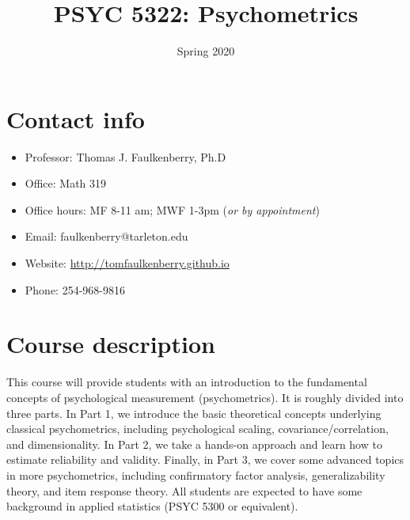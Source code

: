 \documentclass[10pt]{article}
\date{Spring 2020}
\title{PSYC 5322: Psychometrics}
\begin{document}
\maketitle

\section*{Contact info}
\label{sec:orgef0183f}
\begin{itemize}
\item Professor: Thomas J. Faulkenberry, Ph.D
\item Office: Math 319
\item Office hours: MF 8-11 am; MWF 1-3pm (\emph{or by appointment})
\item Email: faulkenberry@tarleton.edu
\item Website: \url{http://tomfaulkenberry.github.io}
\item Phone: 254-968-9816
\end{itemize}

\section*{Course description}
\label{sec:org1a687d4}

This course will provide students with an introduction to the fundamental concepts of psychological measurement (psychometrics). It is roughly divided into three parts. In Part 1, we introduce the basic theoretical concepts underlying classical psychometrics, including psychological scaling, covariance/correlation, and dimensionality. In Part 2, we take a hands-on approach and learn how to estimate reliability and validity. Finally, in Part 3, we cover some advanced topics in more psychometrics, including confirmatory factor analysis, generalizability theory, and item response theory. All students are expected to have some background in applied statistics (PSYC 5300 or equivalent). 
\end{document}
